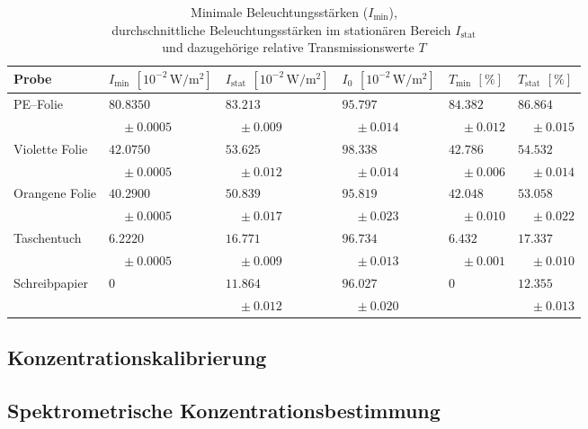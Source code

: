 \documentclass[12pt,a4paper]{scrartcl}
\numberwithin{equation}{section} %
\begin{document}
\begin{table}[h!]
	\centering
	\begin{tabular}{l|p{2.1cm}|p{2.1cm}|p{2.1cm}|p{1.8cm}|p{1.8cm}}
		Probe
			& $I_\mathrm{min}$ $[10^{-2} \mathrm{\, W/m^2}]$
			& $I_\mathrm{stat}$ $[10^{-2} \mathrm{\, W/m^2}]$
			& $I_0$ $[10^{-2} \mathrm{\, W/m^2}]$
			& $T_\mathrm{min}$ $[\%]$
			& $T_\mathrm{stat}$ $[\%]$ \\
		\hline
		PE--Folie
			& $80.8350$
			& $83.213$
			& $95.797$
			& $84.382$
			& $86.864$ \\
			& $\quad\pm 0.0005$
			& $\quad\pm 0.009$
			& $\quad\pm 0.014$
			& $\quad\pm 0.012$
			& $\quad\pm 0.015$ \\
		Violette Folie
			& $42.0750$
			& $53.625$
			& $98.338$
			& $42.786$
			& $54.532$ \\
			& $\quad\pm 0.0005$
			& $\quad\pm 0.012$
			& $\quad\pm 0.014$
			& $\quad\pm 0.006$
			& $\quad\pm 0.014$ \\
		Orangene Folie
			 & $40.2900$
			 & $50.839$
			 & $95.819$
			 & $42.048$
			 & $53.058$ \\
			 & $\quad\pm 0.0005$
             & $\quad\pm 0.017$
			 & $\quad\pm 0.023$
			 & $\quad\pm 0.010$
			 & $\quad\pm 0.022$ \\
		Taschentuch
			 & $6.2220$
			 & $16.771$
			 & $96.734$
			 & $6.432$
			 & $17.337$ \\
			 & $\quad\pm 0.0005$
			 & $\quad\pm 0.009$
			 & $\quad\pm 0.013$
			 & $\quad\pm 0.001$
			 & $\quad\pm 0.010$ \\
		Schreibpapier
			 & $0$
			 & $11.864$
			 & $96.027$
			 & $0$
			 & $12.355$ \\
			 &&$\quad\pm 0.012$
			 & $\quad\pm 0.020$
			 && $\quad\pm 0.013$ \\
	\end{tabular}
	\caption{Minimale Beleuchtungsstärken ($I_\mathrm{min}$),\\
		durchschnittliche Beleuchtungsstärken im stationären Bereich $I_\mathrm{stat}$\\
		und dazugehörige relative Transmissionswerte $T$}
	\label{table:materialien}
\end{table}

\subsection{Konzentrationskalibrierung}
\label{Konzentrationskalibrierung}

\subsection{Spektrometrische Konzentrationsbestimmung}
\label{Spektrometrische Konzentrationsbestimmung}
\end{document}
